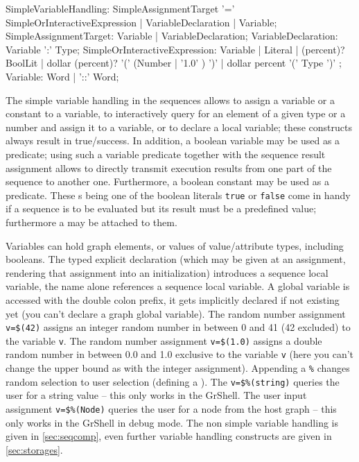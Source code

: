 \begin{rail}
  SimpleVariableHandling: SimpleAssignmentTarget '=' SimpleOrInteractiveExpression | VariableDeclaration | Variable;
  SimpleAssignmentTarget: Variable | VariableDeclaration; 
	VariableDeclaration: Variable ':' Type;
	SimpleOrInteractiveExpression:
		Variable |  
		Literal | 
    (percent)? BoolLit |
		dollar (percent)? '(' (Number | '1.0' ) ')' |
		dollar percent '(' Type ')'
  ;
  Variable: Word | '::' Word;
\end{rail}\makeatother

The simple variable handling in the sequences allows to assign a variable or a constant to a variable, to interactively query for an element of a given type or a number and assign it to a variable, or to declare a local variable; these constructs always result in true/success.
In addition, a boolean variable may be used as a predicate; using such a variable predicate together with the sequence result assignment allows to directly transmit execution results from one part of the sequence to another one.
Furthermore, a boolean constant may be used as a predicate. 
These s being one of the boolean literals \texttt{true} or \texttt{false} come in handy if a sequence is to be evaluated but its result must be a predefined value; furthermore a  may be attached to them.

Variables can hold graph elements, or values of value/attribute types, including booleans.
The typed explicit declaration (which may be given at an assignment, rendering that assignment into an initialization) introduces a sequence local variable, the name alone references a sequence local variable.
A global variable is accessed with the double colon prefix, it gets implicitly declared if not existing yet (you can't declare a graph global variable).
The random number assignment \texttt{v=\$(42)} assigns an integer random number in between 0 and 41 (42 excluded) to the variable \texttt{v}. 
The random number assignment \texttt{v=\$(1.0)} assigns a double random number in between 0.0 and 1.0 exclusive to the variable \texttt{v} (here you can't change the upper bound as with the integer assignment). 
Appending a \texttt{\%} changes random selection to user selection (defining a ).
The  \texttt{v=\$\%(string)} queries the user for a string value -- this only works in the GrShell.
The user input assignment \texttt{v=\$\%(Node)} queries the user for a node from the host graph -- this only works in the GrShell in debug mode.
The non simple variable handling is given in \ref{sec:seqcomp}, even further variable handling constructs are given in \ref{sec:storages}.

